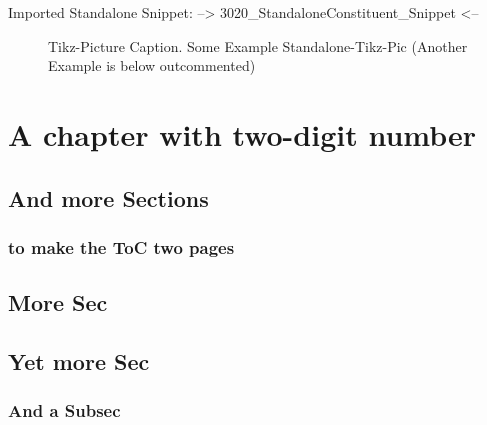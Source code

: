 \np
Imported Standalone Snippet: -->
{3020_StandaloneConstituent_Snippet}
<--


\npi%
{%
    \Huge%
    \sffamily%
    \textcolor{violet}{%
    }\nl%
    \textcolor{violet}{%
    }%
}%


\np
%
\begin{figure}[!htpb]
    \centering
    \caption{Tikz-Picture Caption. Some Example Standalone-Tikz-Pic (Another Example is below outcommented)}
    \label{fig:tikz_test}
\end{figure}
%
%
%
%



\setcounter{chapter}{9}
\chapter{A chapter with two-digit number}
\section{And more Sections}
\subsection{to make the ToC two pages}
\section{More Sec}
\section{Yet more Sec}
\subsection{And a Subsec}


